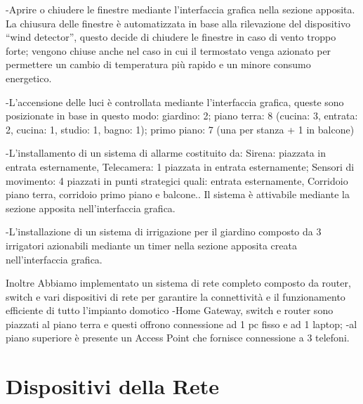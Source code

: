 \documentclass[italian, 12pt, a4paper]{article}
\begin{document}
-Aprire o chiudere le finestre mediante l’interfaccia grafica nella sezione apposita.
La chiusura delle finestre è automatizzata in base alla rilevazione del dispositivo “wind detector”, questo decide di chiudere le finestre in caso di vento troppo forte;
vengono chiuse anche nel caso in cui il termostato venga azionato per permettere un cambio di temperatura più rapido e un minore consumo energetico.

-L’accensione delle luci è controllata mediante l’interfaccia grafica, queste sono posizionate in base in questo modo:
giardino: 2;
piano terra: 8 (cucina: 3, entrata: 2, cucina: 1, studio: 1, bagno: 1);
primo piano: 7 (una per stanza + 1 in balcone)

-L'installamento di un sistema di allarme costituito da:
Sirena: piazzata in entrata esternamente, 
Telecamera: 1 piazzata in entrata esternamente;
Sensori di movimento: 4 piazzati in punti strategici quali: entrata esternamente, Corridoio piano terra, corridoio primo piano e balcone..
Il sistema è attivabile mediante la sezione apposita nell’interfaccia grafica.

-L'installazione di un sistema di irrigazione per il giardino composto da 3 irrigatori azionabili mediante un timer nella sezione apposita creata nell’interfaccia grafica.

Inoltre Abbiamo implementato un sistema di rete completo composto da router, switch e vari dispositivi di rete per garantire la connettività e il funzionamento efficiente di tutto l'impianto domotico
-Home Gateway, switch e router sono piazzati al piano terra e questi offrono connessione ad 1 pc fisso e ad 1 laptop;
-al piano superiore è presente un Access Point che fornisce connessione a 3 telefoni.
\clearpage
\section{Dispositivi della Rete}\label{sec:dispositivi}
\end{document}

